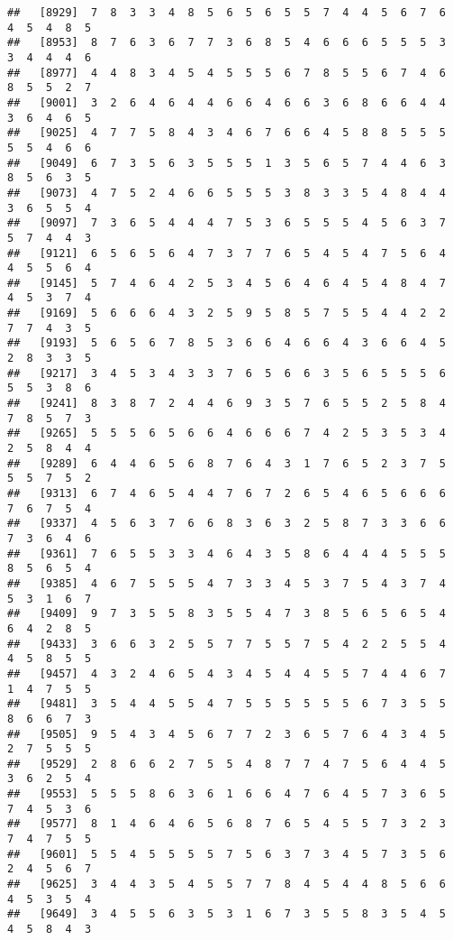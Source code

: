 \documentclass[
]{book}
\begin{document}
\begin{verbatim}
##   [8929]  7  8  3  3  4  8  5  6  5  6  5  5  7  4  4  5  6  7  6  4  5  4  8  5
##   [8953]  8  7  6  3  6  7  7  3  6  8  5  4  6  6  6  5  5  5  3  3  4  4  4  6
##   [8977]  4  4  8  3  4  5  4  5  5  5  6  7  8  5  5  6  7  4  6  8  5  5  2  7
##   [9001]  3  2  6  4  6  4  4  6  6  4  6  6  3  6  8  6  6  4  4  3  6  4  6  5
##   [9025]  4  7  7  5  8  4  3  4  6  7  6  6  4  5  8  8  5  5  5  5  5  4  6  6
##   [9049]  6  7  3  5  6  3  5  5  5  1  3  5  6  5  7  4  4  6  3  8  5  6  3  5
##   [9073]  4  7  5  2  4  6  6  5  5  5  3  8  3  3  5  4  8  4  4  3  6  5  5  4
##   [9097]  7  3  6  5  4  4  4  7  5  3  6  5  5  5  4  5  6  3  7  5  7  4  4  3
##   [9121]  6  5  6  5  6  4  7  3  7  7  6  5  4  5  4  7  5  6  4  4  5  5  6  4
##   [9145]  5  7  4  6  4  2  5  3  4  5  6  4  6  4  5  4  8  4  7  4  5  3  7  4
##   [9169]  5  6  6  6  4  3  2  5  9  5  8  5  7  5  5  4  4  2  2  7  7  4  3  5
##   [9193]  5  6  5  6  7  8  5  3  6  6  4  6  6  4  3  6  6  4  5  2  8  3  3  5
##   [9217]  3  4  5  3  4  3  3  7  6  5  6  6  3  5  6  5  5  5  6  5  5  3  8  6
##   [9241]  8  3  8  7  2  4  4  6  9  3  5  7  6  5  5  2  5  8  4  7  8  5  7  3
##   [9265]  5  5  5  6  5  6  6  4  6  6  6  7  4  2  5  3  5  3  4  2  5  8  4  4
##   [9289]  6  4  4  6  5  6  8  7  6  4  3  1  7  6  5  2  3  7  5  5  5  7  5  2
##   [9313]  6  7  4  6  5  4  4  7  6  7  2  6  5  4  6  5  6  6  6  7  6  7  5  4
##   [9337]  4  5  6  3  7  6  6  8  3  6  3  2  5  8  7  3  3  6  6  7  3  6  4  6
##   [9361]  7  6  5  5  3  3  4  6  4  3  5  8  6  4  4  4  5  5  5  8  5  6  5  4
##   [9385]  4  6  7  5  5  5  4  7  3  3  4  5  3  7  5  4  3  7  4  5  3  1  6  7
##   [9409]  9  7  3  5  5  8  3  5  5  4  7  3  8  5  6  5  6  5  4  6  4  2  8  5
##   [9433]  3  6  6  3  2  5  5  7  7  5  5  7  5  4  2  2  5  5  4  4  5  8  5  5
##   [9457]  4  3  2  4  6  5  4  3  4  5  4  4  5  5  7  4  4  6  7  1  4  7  5  5
##   [9481]  3  5  4  4  5  5  4  7  5  5  5  5  5  5  6  7  3  5  5  8  6  6  7  3
##   [9505]  9  5  4  3  4  5  6  7  7  2  3  6  5  7  6  4  3  4  5  2  7  5  5  5
##   [9529]  2  8  6  6  2  7  5  5  4  8  7  7  4  7  5  6  4  4  5  3  6  2  5  4
##   [9553]  5  5  5  8  6  3  6  1  6  6  4  7  6  4  5  7  3  6  5  7  4  5  3  6
##   [9577]  8  1  4  6  4  6  5  6  8  7  6  5  4  5  5  7  3  2  3  7  4  7  5  5
##   [9601]  5  5  4  5  5  5  5  7  5  6  3  7  3  4  5  7  3  5  6  2  4  5  6  7
##   [9625]  3  4  4  3  5  4  5  5  7  7  8  4  5  4  4  8  5  6  6  4  5  3  5  4
##   [9649]  3  4  5  5  6  3  5  3  1  6  7  3  5  5  8  3  5  4  5  4  5  8  4  3

\end{verbatim}
\end{document}
